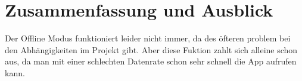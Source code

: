 \chapter{Zusammenfassung und Ausblick}
\thispagestyle{standard}
\pagestyle{standard}
\renewcommand{\footrulewidth}{0.4pt}

Der Offline Modus funktioniert leider nicht immer, da des öfteren problem bei den Abhängigkeiten im Projekt gibt. Aber diese Fuktion zahlt sich alleine schon aus, 
da man mit einer schlechten Datenrate schon sehr schnell die App aufrufen kann.